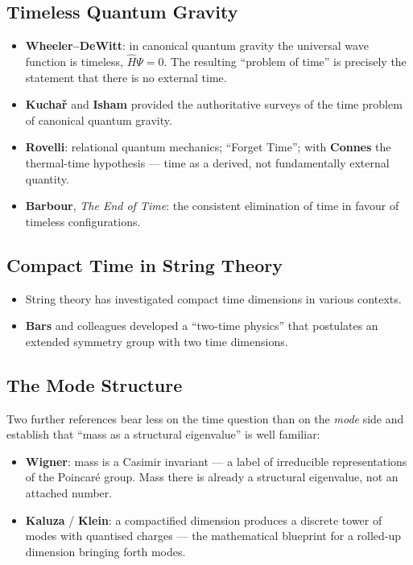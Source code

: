 \subsection{Timeless Quantum Gravity}
\begin{itemize}[leftmargin=1.4em,itemsep=0.25em]
 \item \textbf{Wheeler--DeWitt}: in canonical quantum gravity the universal wave function is timeless, $\hat{H}\Psi = 0$. The resulting ``problem of time'' is precisely the statement that there is no external time.
 \item \textbf{Kucha\v{r}} and \textbf{Isham} provided the authoritative surveys of the time problem of canonical quantum gravity.
 \item \textbf{Rovelli}: relational quantum mechanics; ``Forget Time''; with \textbf{Connes} the thermal-time hypothesis --- time as a derived, not fundamentally external quantity.
 \item \textbf{Barbour}, \emph{The End of Time}: the consistent elimination of time in favour of timeless configurations.
\end{itemize}

\subsection{Compact Time in String Theory}
\begin{itemize}[leftmargin=1.4em,itemsep=0.25em]
 \item String theory has investigated compact time dimensions in various contexts.
 \item \textbf{Bars} and colleagues developed a ``two-time physics'' that postulates an extended symmetry group with two time dimensions.
\end{itemize}

\subsection{The Mode Structure}
Two further references bear less on the time question than on the \emph{mode} side and establish that ``mass as a structural eigenvalue'' is well familiar:
\begin{itemize}[leftmargin=1.4em,itemsep=0.25em]
 \item \textbf{Wigner}: mass is a Casimir invariant --- a label of irreducible representations of the Poincaré group. Mass there is already a structural eigenvalue, not an attached number.
 \item \textbf{Kaluza} / \textbf{Klein}: a compactified dimension produces a discrete tower of modes with quantised charges --- the mathematical blueprint for a rolled-up dimension bringing forth modes.
\end{itemize}

